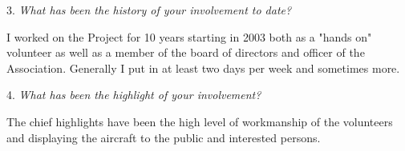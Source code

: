 \begin{multicols}{2}

3. \textit{What has been the history of your involvement to date?}

I worked on the Project for 10 years starting in 2003 both as a "hands
on" volunteer as well as a member of the board of directors and officer
of the Association. Generally I put in at least two days per week and
sometimes more. 



4. \textit{What has been the highlight of your involvement?}

The chief highlights have been the high level of workmanship of the
volunteers and displaying the aircraft to the public and interested
persons.



\end{multicols}
